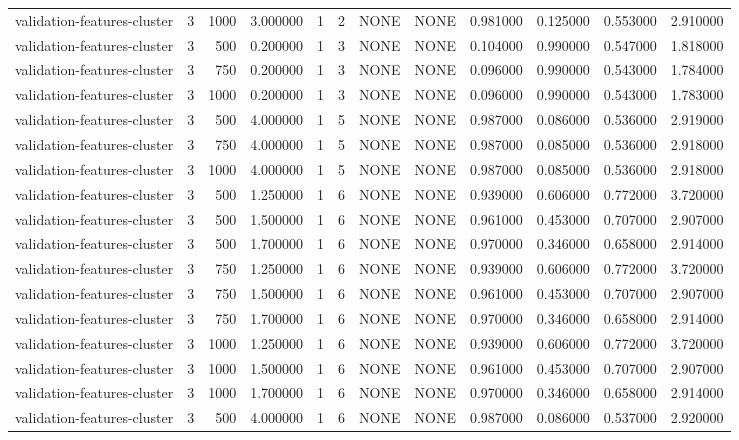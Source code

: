 \begin{tabular}{lrrrllllrrrr}
validation-features-cluster & 3 & 1000 & 3.000000 & 1 & 2 & NONE & NONE & 0.981000 & 0.125000 & 0.553000 & 2.910000 \\
validation-features-cluster & 3 & 500 & 0.200000 & 1 & 3 & NONE & NONE & 0.104000 & 0.990000 & 0.547000 & 1.818000 \\
validation-features-cluster & 3 & 750 & 0.200000 & 1 & 3 & NONE & NONE & 0.096000 & 0.990000 & 0.543000 & 1.784000 \\
validation-features-cluster & 3 & 1000 & 0.200000 & 1 & 3 & NONE & NONE & 0.096000 & 0.990000 & 0.543000 & 1.783000 \\
validation-features-cluster & 3 & 500 & 4.000000 & 1 & 5 & NONE & NONE & 0.987000 & 0.086000 & 0.536000 & 2.919000 \\
validation-features-cluster & 3 & 750 & 4.000000 & 1 & 5 & NONE & NONE & 0.987000 & 0.085000 & 0.536000 & 2.918000 \\
validation-features-cluster & 3 & 1000 & 4.000000 & 1 & 5 & NONE & NONE & 0.987000 & 0.085000 & 0.536000 & 2.918000 \\
validation-features-cluster & 3 & 500 & 1.250000 & 1 & 6 & NONE & NONE & 0.939000 & 0.606000 & 0.772000 & 3.720000 \\
validation-features-cluster & 3 & 500 & 1.500000 & 1 & 6 & NONE & NONE & 0.961000 & 0.453000 & 0.707000 & 2.907000 \\
validation-features-cluster & 3 & 500 & 1.700000 & 1 & 6 & NONE & NONE & 0.970000 & 0.346000 & 0.658000 & 2.914000 \\
validation-features-cluster & 3 & 750 & 1.250000 & 1 & 6 & NONE & NONE & 0.939000 & 0.606000 & 0.772000 & 3.720000 \\
validation-features-cluster & 3 & 750 & 1.500000 & 1 & 6 & NONE & NONE & 0.961000 & 0.453000 & 0.707000 & 2.907000 \\
validation-features-cluster & 3 & 750 & 1.700000 & 1 & 6 & NONE & NONE & 0.970000 & 0.346000 & 0.658000 & 2.914000 \\
validation-features-cluster & 3 & 1000 & 1.250000 & 1 & 6 & NONE & NONE & 0.939000 & 0.606000 & 0.772000 & 3.720000 \\
validation-features-cluster & 3 & 1000 & 1.500000 & 1 & 6 & NONE & NONE & 0.961000 & 0.453000 & 0.707000 & 2.907000 \\
validation-features-cluster & 3 & 1000 & 1.700000 & 1 & 6 & NONE & NONE & 0.970000 & 0.346000 & 0.658000 & 2.914000 \\
validation-features-cluster & 3 & 500 & 4.000000 & 1 & 6 & NONE & NONE & 0.987000 & 0.086000 & 0.537000 & 2.920000 \\

\end{tabular}
